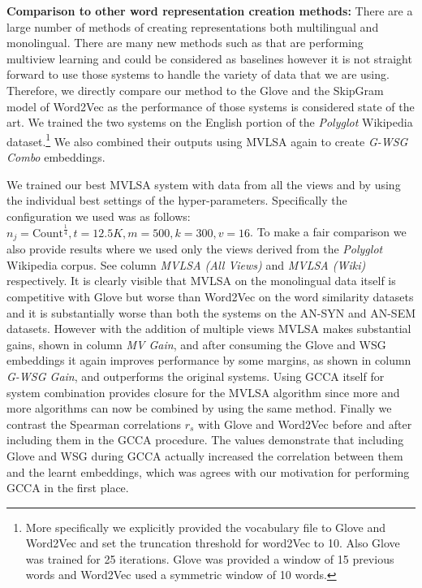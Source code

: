 \documentclass[11pt]{article}
\begin{document}
\noindent\textbf{Comparison to other word representation creation methods:}
There are a large number of methods of creating representations both
multilingual and monolingual. There are many new methods such as
that are performing multiview learning and could be considered as
baselines however it is not straight forward to use those systems to
handle the variety of data that we are using. Therefore, we directly
compare our method to the Glove and the SkipGram model of Word2Vec as
the performance of those systems is considered state of the art.  
We trained the two systems on the English portion of the
\textit{Polyglot} Wikipedia dataset.\footnote{More specifically
we explicitly provided the vocabulary file to Glove and Word2Vec and set the
truncation threshold for word2Vec to 10. Also Glove was trained for 25
iterations. Glove was provided a window of 15 previous words and Word2Vec
used a symmetric window of 10 words.} We also combined their outputs
using MVLSA again to create \emph{G-WSG Combo} embeddings.

We trained our best MVLSA system with data from all the views and by
using the individual best settings of 
the hyper-parameters. Specifically the configuration we used was as
follows: $n_j = \text{Count}^\frac{1}{4}, t=12.5K, m=500, k=300,
v=16$. To make a fair comparison we also provide 
results where we used only the views derived from the \textit{Polyglot}
Wikipedia corpus. See column \emph{MVLSA (All Views)} and \emph{MVLSA
  (Wiki)} respectively. It is clearly visible that MVLSA on the
monolingual data itself is competitive with Glove but
worse than Word2Vec on the word similarity datasets and it is
substantially worse than both the systems on the AN-SYN 
and AN-SEM datasets. However with the addition of multiple views MVLSA
makes substantial gains, shown in column \emph{MV Gain}, and after consuming the Glove and WSG
embeddings it again improves performance by some margins, as shown in
column \emph{G-WSG Gain}, and outperforms the original systems. 
Using GCCA itself for system combination provides closure
for the MVLSA algorithm since more and more algorithms can now be
combined by using the same method. Finally we contrast the Spearman
correlations $r_s$ with Glove and Word2Vec before and after including
them in the GCCA procedure. The values demonstrate that including Glove and WSG
  during GCCA actually increased the  correlation between them and the
  learnt embeddings, which was agrees with our motivation for
  performing GCCA in the first place.
\end{document}
